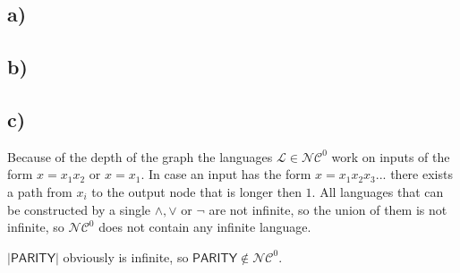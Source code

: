 \documentclass[10pt]{article}
\newcommand{\NC}{\mathcal{NC}}
\newcommand{\Ll}{\mathcal{L}}
\newcommand{\Par}{\textsf{PARITY}}
\begin{document}
  \subsection*{a)}

  \subsection*{b)}

  \subsection*{c)}
    Because of the depth of the graph the languages $\Ll \in \NC^{0}$
    work on inputs of the form $x=x_1 x_2$ or $x=x_1$. In case an input has the form
    $x=x_1 x_2 x_3...$ there exists a path from $x_i$ to the output node that is
    longer then $1$. All languages that can be constructed by a single $\land, \lor$
    or $\neg$ are not infinite, so the union of them is not infinite, so $\NC^{0}$
    does not contain any infinite language.

    $|\Par|$ obviously is infinite, so $\Par \not \in \NC^{0}$.
  
\end{document}
